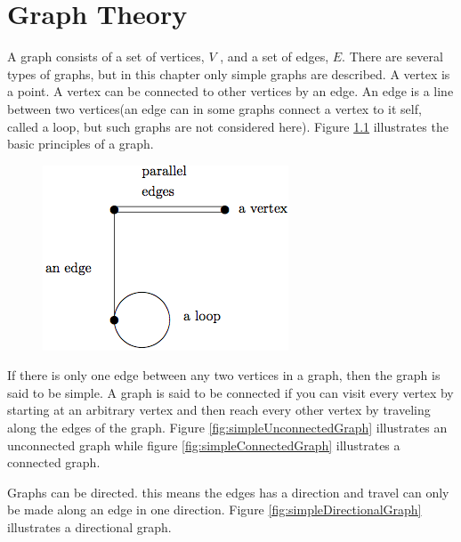 \chapter {Graph Theory}
\label{chap:graphTheory}

A graph consists of a set of vertices, $V$ \cite[p. 592]{Rosen07}, and a set of edges, $E$. There are several types of graphs, but in this chapter only simple graphs are described. 
A vertex is a point. A vertex can be connected to other vertices by an edge.
An edge is a line between two vertices(an edge can in some graphs connect a vertex to it self, called a loop, but such graphs are not considered here). Figure \ref{fig:generalDescriptionGraph} illustrates the basic principles of a graph.
\begin{figure}[ht]
	\centering
		\includegraphics[scale = 0.7]{input/pics/generalDescriptionGraph.png}
	\caption{}
	\label{fig:generalDescriptionGraph}
\end{figure}

If there is only one edge between any two vertices in a graph, then the graph is said to be simple.
A graph is said to be connected if you can visit every vertex by starting at an arbitrary vertex and then reach every other vertex by traveling along the edges of the graph. Figure \ref{fig:simpleUnconnectedGraph} illustrates an unconnected graph while figure \ref{fig:simpleConnectedGraph} illustrates a connected graph. 

Graphs can be directed. this means the edges has a direction and travel can only be made along an edge in one direction. Figure \ref{fig:simpleDirectionalGraph} illustrates a directional graph. 

